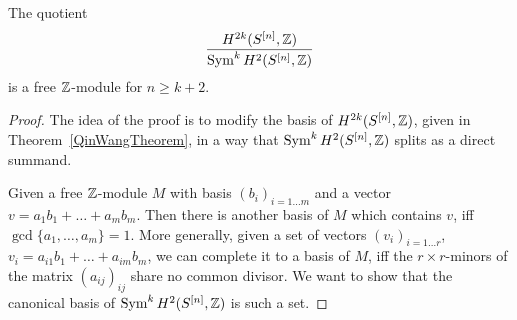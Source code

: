 \begin{theorem}\label{freeness}
The quotient
$$
 \frac{H^{2k}(S^{[n]},\mathbb{Z})}{\operatorname{Sym}^k H^{2}(S^{[n]},\mathbb{Z})}
$$
is a free $\mathbb{Z}$-module for $n\geq k+2$.
\end{theorem}
\begin{proof}
The idea of the proof is to modify the basis of $H^{2k}(S^{[n]},\mathbb{Z})$, given in Theorem~\ref{QinWangTheorem}, in a way that $\operatorname{Sym}^k H^{2}(S^{[n]},\mathbb{Z})$ splits as a direct summand. 

Given a free $\mathbb{Z}$-module $M$ with basis $(b_i)_{i=1\ldots m}$ and a vector $v = a_1b_1 + \ldots + a_mb_m$. Then there is another basis of $M$ which contains $v$, iff $\gcd\{a_1,\ldots,a_m\} = 1$. More generally, given a set of vectors $(v_i)_{i=1\ldots r}$, $v_i=a_{i1}b_1+\ldots+a_{im}b_m$, we can complete it to a basis of $M$, iff the $r\times r$-minors of the matrix $(a_{ij})_{ij}$ share no common divisor. We want to show that the canonical basis of $\operatorname{Sym}^k H^{2}(S^{[n]},\mathbb{Z})$ is such a set.


\end{proof}
